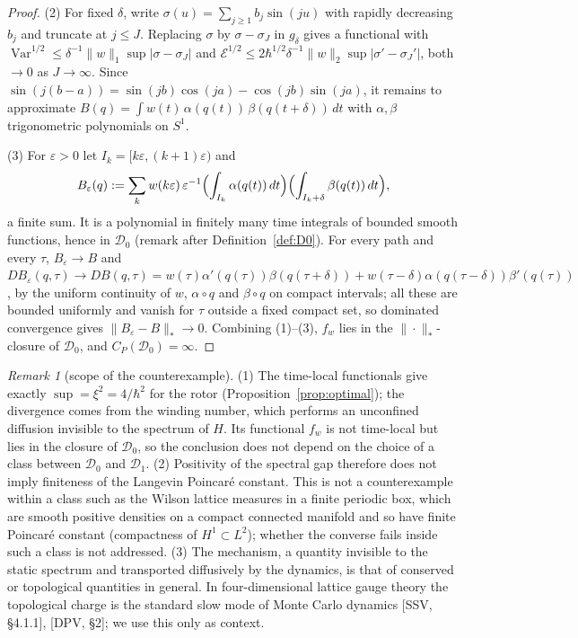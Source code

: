 \documentclass[11pt,a4paper]{article}
\theoremstyle{definition}
\theoremstyle{remark}
\newtheorem{remark}[theorem]{Remark}
\newcommand{\Var}{\operatorname{Var}}
\newcommand{\cE}{\mathcal{E}}
\newcommand{\cD}{\mathcal{D}}
\begin{document}
\begin{proof}
(2) For fixed $\delta$, write $\sigma(u)=\sum_{j\ge1}b_j\sin(ju)$ with rapidly decreasing $b_j$ and truncate at $j\le J$.
Replacing $\sigma$ by $\sigma-\sigma_J$ in $g_\delta$ gives a functional with $\Var^{1/2}\le\delta^{-1}\|w\|_1\sup|\sigma-\sigma_J|$ and $\cE^{1/2}\le2\hbar^{1/2}\delta^{-1}\|w\|_2\sup|\sigma'-\sigma_J'|$, both $\to0$ as $J\to\infty$.
Since $\sin(j(b-a))=\sin(jb)\cos(ja)-\cos(jb)\sin(ja)$, it remains to approximate $B(q)=\int w(t)\,\alpha(q(t))\,\beta(q(t+\delta))\,dt$ with $\alpha,\beta$ trigonometric polynomials on $S^1$.

(3) For $\varepsilon>0$ let $I_k=[k\varepsilon,(k+1)\varepsilon)$ and
\[
  B_\varepsilon(q):=\sum_kw(k\varepsilon)\,\varepsilon^{-1}\Bigl(\int_{I_k}\alpha(q(t))\,dt\Bigr)\Bigl(\int_{I_k+\delta}\beta(q(t))\,dt\Bigr),
\]
a finite sum. It is a polynomial in finitely many time integrals of bounded smooth functions, hence in $\cD_0$ (remark after Definition~\ref{def:D0}).
For every path and every $\tau$, $B_\varepsilon\to B$ and $DB_\varepsilon(q,\tau)\to DB(q,\tau)=w(\tau)\alpha'(q(\tau))\beta(q(\tau+\delta))+w(\tau-\delta)\alpha(q(\tau-\delta))\beta'(q(\tau))$, by the uniform continuity of $w$, $\alpha\circ q$ and $\beta\circ q$ on compact intervals; all these are bounded uniformly and vanish for $\tau$ outside a fixed compact set, so dominated convergence gives $\|B_\varepsilon-B\|_*\to0$.
Combining (1)--(3), $f_w$ lies in the $\|\cdot\|_*$-closure of $\cD_0$, and $C_P(\cD_0)=\infty$.
\end{proof}



\begin{remark}[scope of the counterexample]\label{rem:rotorscope}
(1) The time-local functionals give exactly $\sup=\xi^2=4/\hbar^2$ for the rotor (Proposition~\ref{prop:optimal}); the divergence comes from the winding number, which performs an unconfined diffusion invisible to the spectrum of $H$. Its functional $f_w$ is not time-local but lies in the closure of $\cD_0$, so the conclusion does not depend on the choice of a class between $\cD_0$ and $\cD_1$.
(2) Positivity of the spectral gap therefore does not imply finiteness of the Langevin Poincar\'e constant.
This is not a counterexample within a class such as the Wilson lattice measures in a finite periodic box, which are smooth positive densities on a compact connected manifold and so have finite Poincar\'e constant (compactness of $H^1\subset L^2$); whether the converse fails inside such a class is not addressed.
(3) The mechanism, a quantity invisible to the static spectrum and transported diffusively by the dynamics, is that of conserved or topological quantities in general.
In four-dimensional lattice gauge theory the topological charge is the standard slow mode of Monte Carlo dynamics [SSV, \S4.1.1], [DPV, \S2]; we use this only as context.
\end{remark}
\end{document}
